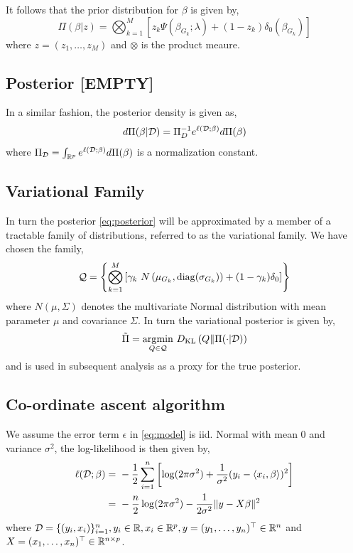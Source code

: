 \documentclass[12pt]{article}
\begin{document}
It follows that the prior distribution for $\beta$ is given by,
\begin{equation}
\Pi(\beta | z) = \bigotimes_{k=1}^{M} \left[ 
    z_k \Psi(\beta_{G_k}; \lambda) + (1-z_k)\delta_0(\beta_{G_k})
\right]
\end{equation}
where $z = (z_1, \dots, z_M)$ and $\otimes$ is the product meaure.

\subsection{Posterior [EMPTY]}

In a similar fashion, the posterior density is given as,
\begin{equation} \label{eq:posterior} 
d\Pi(\beta | \mathcal{D}) = \Pi_D^{-1} e^{\ell(\mathcal{D}; \beta)} d\Pi(\beta)
\end{equation}
where $\Pi_{\mathcal{D}} = \int_{\mathbb{R}^{p}} e^{\ell(\mathcal{D}; \beta)} d\Pi(\beta)$ is a normalization constant.


\subsection{Variational Family}

In turn the posterior \eqref{eq:posterior} will be approximated by a member of a tractable family of distributions, referred to as the variational family. We have chosen the family,
\begin{equation}
\mathcal{Q} = \left\{ \bigotimes_{k=1}^M \left[ 
    \gamma_k\ N\left(\mu_{G_k}, \operatorname{diag}( \sigma_{G_k}) \right) + (1-\gamma_k) \delta_0
\right] \right\}
\end{equation}
where $N(\mu, \Sigma)$ denotes the multivariate Normal distribution with mean parameter $\mu$ and covariance $\Sigma$. In turn the variational posterior is given by,
\begin{equation} \label{eq:optim} 
\tilde{\Pi} = \underset{Q \in \mathcal{Q}}{{\arg\!\min}}\ D_\text{KL}\left( Q \| \Pi(\cdot |\mathcal{D}) \right)
\end{equation}
and is used in subsequent analysis as a proxy for the true posterior.

\subsection{Co-ordinate ascent algorithm}

We assume the error term $\epsilon$ in \eqref{eq:model} is iid. Normal with mean $0$ and variance $\sigma^2$, the log-likelihood is then given by,
\begin{align}
    \ell(\mathcal{D}; \beta) = &\ -\frac{1}{2} \sum_{i=1}^n \left[ 
	\log(2\pi \sigma^2) + \frac{1}{\sigma^2} 
	(y_i - \langle x_i, \beta \rangle)^2
    \right] \nonumber \\
    =&\ - \frac{n}{2}\log(2\pi\sigma^2) - \frac{1}{2\sigma^2} \| y - X \beta \|^2 \label{eq:log-likelihood}
\end{align}
where $\mathcal{D} = \{ (y_i, x_i) \}_{i=1}^n, y_i \in \mathbb{R}, x_i \in \mathbb{R}^p,  y = (y_1, \dots, y_n)^\top \in \mathbb{R}^n$ and $X = (x_1, \dots, x_n)^\top \in \mathbb{R}^{n \times p}$.
\end{document}
